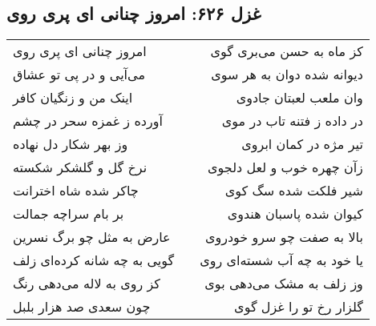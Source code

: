\begin{center}
\section*{غزل ۶۲۶: امروز چنانی ای پری روی}
\label{sec:626}
\begin{longtable}{l p{0.5cm} r}
امروز چنانی ای پری روی
&&
کز ماه به حسن می‌بری گوی
\\
می‌آیی و در پی تو عشاق
&&
دیوانه شده دوان به هر سوی
\\
اینک من و زنگیان کافر
&&
وان ملعب لعبتان جادوی
\\
آورده ز غمزه سحر در چشم
&&
در داده ز فتنه تاب در موی
\\
وز بهر شکار دل نهاده
&&
تیر مژه در کمان ابروی
\\
نرخ گل و گلشکر شکسته
&&
زآن چهره خوب و لعل دلجوی
\\
چاکر شده شاه اخترانت
&&
شیر فلکت شده سگ کوی
\\
بر بام سراچه جمالت
&&
کیوان شده پاسبان هندوی
\\
عارض به مثل چو برگ نسرین
&&
بالا به صفت چو سرو خودروی
\\
گویی به چه شانه کرده‌ای زلف
&&
یا خود به چه آب شسته‌ای روی
\\
کز روی به لاله می‌دهی رنگ
&&
وز زلف به مشک می‌دهی بوی
\\
چون سعدی صد هزار بلبل
&&
گلزار رخ تو را غزل گوی
\\
\end{longtable}
\end{center}

